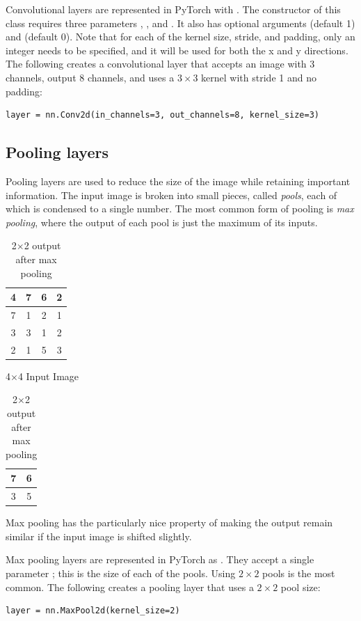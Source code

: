 Convolutional layers are represented in PyTorch with .
The constructor of this class requires three parameters , , and .
It also has optional arguments  (default 1) and  (default 0).
Note that for each of the kernel size, stride, and padding, only an integer needs to be specified, and it will be used for both the x and y directions.
The following creates a convolutional layer that accepts an image with 3 channels, output 8 channels, and uses a \(3\times 3\) kernel with stride 1 and no padding:
\begin{lstlisting}
layer = nn.Conv2d(in_channels=3, out_channels=8, kernel_size=3)
\end{lstlisting}


\subsection*{Pooling layers}

Pooling layers are used to reduce the size of the image while retaining important information.
The input image is broken into small pieces, called \emph{pools}, each of which is condensed to a single number.
The most common form of pooling is \emph{max pooling}, where the output of each pool is just the maximum of its inputs.

\begin{table}[H]
\parbox{.45\linewidth}{
\centering
\begin{tabular}{|c|c||c|c|}
\hline
4 & 7 & 6 & 2\\
\hline
7 & 1 & 2 & 1\\
\hline
\hline
3 & 3 & 1 & 2\\
\hline
2 & 1 & 5 & 3\\
\hline
\end{tabular}
\label{tab:input}
\caption*{4$\times$4 Input Image}
}
\hfill
\parbox{.45\linewidth}{
\centering
\begin{tabular}{|c|c|}
\hline
7 & 6\\
\hline
3 & 5\\
\hline
\end{tabular}
\label{tab:input}
\caption*{2$\times$2 output after max pooling}
}
\end{table}
Max pooling has the particularly nice property of making the output remain similar if the input image is shifted slightly.

Max pooling layers are represented in PyTorch as .
They accept a single parameter ; this is the size of each of the pools.
Using \(2\times2\) pools is the most common.
The following creates a pooling layer that uses a \(2\times 2\) pool size:
\begin{lstlisting}
layer = nn.MaxPool2d(kernel_size=2)
\end{lstlisting}

